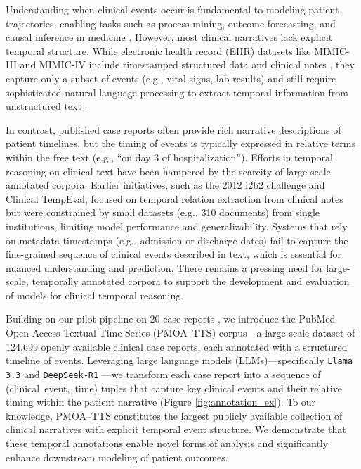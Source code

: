 Understanding when clinical events occur is fundamental to modeling patient trajectories, enabling tasks such as process mining, outcome forecasting, and causal inference in medicine \citep{jensen2012mining, noren2010temporal}.
However, most clinical narratives lack explicit temporal structure. While electronic health record (EHR) datasets like MIMIC-III and MIMIC-IV include timestamped structured data and clinical notes \citep{johnson2016mimic, johnson2023mimic}, they capture only a subset of events (e.g., vital signs, lab results) and still require sophisticated natural language processing to extract temporal information from unstructured text \citep{viani2021temporal, cheng2023typed}.


In contrast, published case reports often provide rich narrative descriptions of patient timelines, but the timing of events is typically expressed in relative terms within the free text (e.g., “on day 3 of hospitalization”).
Efforts in temporal reasoning on clinical text have been hampered by the scarcity of large-scale annotated corpora.
Earlier initiatives, such as the 2012 i2b2 challenge and Clinical TempEval, focused on temporal relation extraction from clinical notes \citep{sun2013evaluating, bethard2016semeval, galvan2018investigating} but were constrained by small datasets (e.g., 310 documents) from single institutions, limiting model performance and generalizability.
Systems that rely on metadata timestamps (e.g., admission or discharge dates) fail to capture the fine-grained sequence of clinical events described in text, which is essential for nuanced understanding and prediction.
There remains a pressing need for large-scale, temporally annotated corpora to support the development and evaluation of models for clinical temporal reasoning.

Building on our pilot pipeline on 20 case reports \citep{wang2025large}, we introduce the PubMed Open Access Textual Time Series (PMOA–TTS) corpus—a large-scale dataset of 124,699 openly available clinical case reports, each annotated with a structured timeline of events.
Leveraging large language models (LLMs)—specifically \texttt{Llama 3.3} \citep{grattafiori2024llama} and \texttt{DeepSeek-R1} \citep{guo2025deepseek}—we transform each case report into a sequence of \mbox{(clinical event, time)} tuples that capture key clinical events and their relative timing within the patient narrative (Figure \ref{fig:annotation_ex}).
To our knowledge, PMOA–TTS constitutes the largest publicly available collection of clinical narratives with explicit temporal event structure.
We demonstrate that these temporal annotations enable novel forms of analysis and significantly enhance downstream modeling of patient outcomes.


